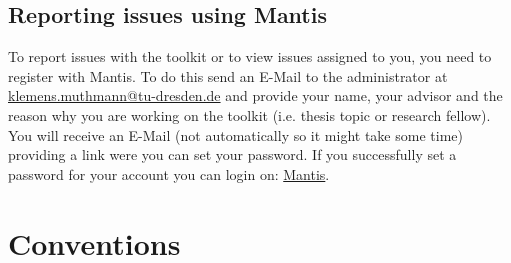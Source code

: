 \documentclass[a4paper,twoside]{article}      %
\begin{document}
\subsection{Reporting issues using Mantis}
To report issues with the toolkit or to view issues assigned to you, you need to register with Mantis. To do this send an E-Mail to the administrator at \href{mailto:klemens.muthmann@tu-dresden.de}{klemens.muthmann@tu-dresden.de} and provide your name, your advisor and the reason why you are working on the toolkit (i.e. thesis topic or research fellow). You will receive an E-Mail (not automatically so it might take some time) providing a link were you can set your password. If you successfully set a password for your account you can login on: \href{http://141.76.40.242/mantisbt}{Mantis}.

\section{Conventions}
\end{document}
